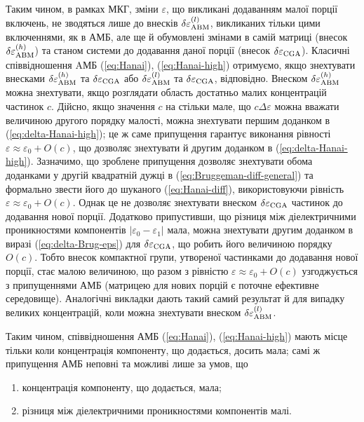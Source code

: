 \documentclass[14pt,twoside]{vakthesis}
\begin{document}
Таким чином, в рамках МКГ, зміни $\varepsilon$, що викликані
додаванням малої порції включень, не зводяться лише до внесків $\delta\varepsilon_{\rm ABM}^{(l)}$,
викликаних тільки цими включеннями, як в АМБ, але ще й обумовлені змінами в самій матриці
(внесок $\delta\varepsilon_{\rm ABM}^{(h)}$) та станом системи до додавання даної порції (внесок $\delta\varepsilon_{\rm CGA}$).
Класичні співвідношення AМБ (\ref{eq:Hanai}), (\ref{eq:Hanai-high}) отримуємо, якщо знехтувати внесками $\delta\varepsilon_{\rm ABM}^{(h)}$ та $\delta\varepsilon_{\rm CGA}$ або $\delta\varepsilon_{\rm ABM}^{(l)}$ та $\delta\varepsilon_{\rm CGA}$, відповідно. 
Внеском $\delta\varepsilon_{\rm ABM}^{(h)}$ можна знехтувати, якщо розглядати область достатньо малих концентрацій частинок $c$. Дійсно, якщо значення $c$ на стільки мале, що $c\Delta\varepsilon$ можна вважати величиною другого порядку малості, можна знехтувати першим доданком в (\ref{eq:delta-Hanai-high}); це ж саме припущення гарантує виконання рівності $\varepsilon \approx \varepsilon_0 + O(c)$, що дозволяє знехтувати й другим доданком в (\ref{eq:delta-Hanai-high}).  Зазначимо, що зроблене припущення дозволяє знехтувати обома доданками у другій квадратній дужці в (\ref{eq:Bruggeman-diff-general}) та формально звести його до шуканого (\ref{eq:Hanai-diff}), використовуючи рівність $\varepsilon \approx \varepsilon_0 + O(c)$. Однак це не дозволяє знехтувати внеском $\delta\varepsilon_{\rm CGA}$ частинок до додавання нової порції. Додатково припустивши, що різниця між діелектричними проникностями компонентів $|\varepsilon_0 - \varepsilon_1|$ мала, можна знехтувати другим доданком в виразі (\ref{eq:delta-Brug-eps}) для $\delta\varepsilon_{\rm CGA}$, що робить його величиною порядку $O(c)$. Тобто внесок компактної групи, утвореної частинками до додавання нової порції, стає малою величиною, що разом з рівністю $\varepsilon \approx \varepsilon_0 + O(c)$ узгоджується з припущеннями АМБ (матрицею для нових порцій є поточне ефективне середовище). 
Аналогічні викладки дають такий самий результат й для випадку великих концентрацій, коли можна знехтувати внеском $\delta\varepsilon_{\rm ABM}^{(l)}$. 

Таким чином, співвідношення АМБ (\ref{eq:Hanai}), (\ref{eq:Hanai-high}) мають місце тільки коли концентрація компоненту, що додається, досить мала; самі ж припущення АМБ неповні та можливі лише за умов, що
\begin{enumerate}[label=\arabic*)]
	\item концентрація компоненту, що додається, мала;
	\item різниця між діелектричними проникностями компонентів малі.
\end{enumerate}
\end{document}
